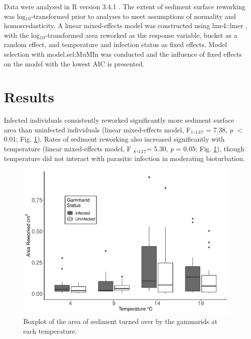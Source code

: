 Data were analysed in R version 3.4.1 \citep{r2017}. The extent of sediment surface reworking was log$_1$$_0$-transformed prior to analyses to meet assumptions of normality and homoscedasticity. A linear mixed-effects model was constructed using lme4::lmer \citep{bates2015}, with the log$_1$$_0$-transformed area reworked as the response variable, bucket as a random effect, and temperature and infection status as fixed effects. Model selection with model.sel:MuMIn \citep{barton2018} was conducted and the influence of fixed effects on the model with the lowest AIC is presented.  

\section{Results}

Infected individuals consistently reworked significantly more sediment surface area than uninfected individuals (linear mixed-effects model, F$_1$,$_1$$_3$$_7$ = 7.38, \emph{p} $<$ 0.01;  Fig. \ref{fig:bioturbbox}). Rates of sediment reworking also increased significantly with temperature (linear mixed-effects model, F $_8$,$_1$$_3$$_7$= 5.30, \emph{p}  = 0.05; Fig. \ref{fig:bioturbbox}), though temperature did not interact with parasitic infection in moderating bioturbation. 

\begin{figure}[H]
    \centering
    \includegraphics[keepaspectratio,width=\textwidth]{figures/ch3/bioturbnoctl.pdf}
  \caption [Surface sediment reworked by infected and uninfected gammarids across a broad temperature range.]{Boxplot of the area of sediment turned over by the gammarids at each temperature.} 
    \label{fig:bioturbbox}
\end{figure}


